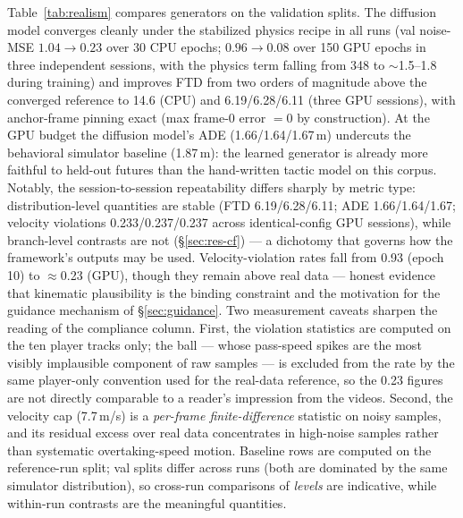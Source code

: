 \documentclass[11pt]{article}
\begin{document}
Table~\ref{tab:realism} compares generators on the validation splits. The
diffusion model converges cleanly under the stabilized physics recipe in all
runs (val noise-MSE $1.04 \rightarrow 0.23$ over 30 CPU epochs;
$0.96 \rightarrow 0.08$ over 150 GPU epochs in three independent sessions,
with the physics term falling from 348 to $\sim$1.5--1.8 during training) and
improves FTD from two orders of magnitude above the converged reference to
14.6 (CPU) and 6.19/6.28/6.11 (three GPU sessions), with anchor-frame pinning exact
(max frame-0 error $= 0$ by construction). At the GPU budget the diffusion
model's ADE (1.66/1.64/1.67\,m) undercuts the behavioral simulator baseline
(1.87\,m): the learned generator is already more faithful to held-out futures
than the hand-written tactic model on this corpus. Notably, the
session-to-session repeatability differs sharply by metric type:
distribution-level quantities are stable (FTD 6.19/6.28/6.11; ADE
1.66/1.64/1.67; velocity violations 0.233/0.237/0.237 across identical-config GPU
sessions), while branch-level contrasts are not (\S\ref{sec:res-cf}) --- a
dichotomy that governs how the framework's outputs may be used.
Velocity-violation rates fall from 0.93 (epoch 10) to $\approx$0.23 (GPU), though they
remain above real data --- honest evidence that kinematic plausibility is the
binding constraint and the motivation for the guidance mechanism of
\S\ref{sec:guidance}. Two measurement caveats sharpen the reading of the
compliance column. First, the violation statistics are computed on the ten
player tracks only; the ball --- whose pass-speed spikes are the most
visibly implausible component of raw samples --- is excluded from the rate
by the same player-only convention used for the real-data reference, so the
0.23 figures are not directly comparable to a reader's impression from the
videos. Second, the velocity cap (7.7\,m/s) is a \emph{per-frame
finite-difference} statistic on noisy samples, and its residual excess over
real data concentrates in high-noise samples rather than systematic
overtaking-speed motion. Baseline rows are computed on the reference-run split;
val splits differ across runs (both are dominated by the same simulator
distribution), so cross-run comparisons of \emph{levels} are indicative,
while within-run contrasts are the meaningful quantities.
\end{document}
